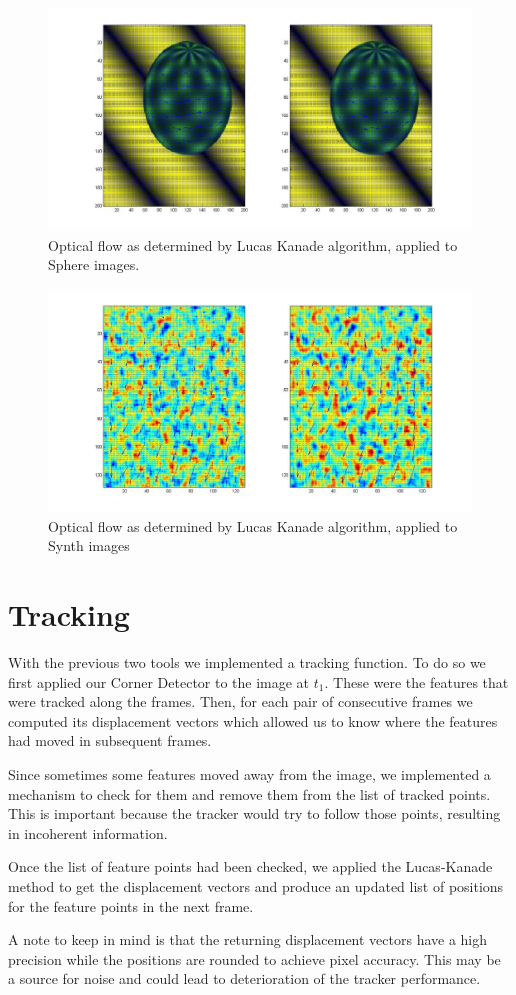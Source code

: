 \documentclass[11pt]{article}
\begin{document}
\begin{figure}[H] \centering
	\includegraphics[width=.8\textwidth]{imgs/sphere.jpg}
	\caption{Optical flow as determined by Lucas Kanade algorithm, applied to Sphere images.}
	\label{fig:sphere_lucas}
\end{figure}

\begin{figure}[H] \centering
	\includegraphics[width=.8\textwidth]{imgs/synth.jpg}
	\caption{Optical flow as determined by Lucas Kanade algorithm, applied to Synth images}
	\label{fig:synth_lucas}
\end{figure}


\section{Tracking}
With the previous two tools we implemented a tracking function. To do so we first applied our Corner Detector to the image at $t_1$. These were the features that were tracked along the frames.  Then, for each pair of consecutive frames we computed its displacement vectors which allowed us to know where the features had moved in subsequent frames. 

Since sometimes some features moved away from the image, we implemented a mechanism to check for them and remove them from the list of tracked points. This is important because the tracker would try to follow those points, resulting in incoherent information.

Once the list of feature points had been checked, we applied the Lucas-Kanade method to get the displacement vectors and produce an updated list of positions for the feature points in the next frame. 

A note to keep in mind is that the returning displacement vectors have a high precision while the positions are rounded to achieve pixel accuracy. This may be a source for noise and could lead to deterioration of the tracker performance.
\end{document}
